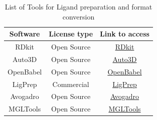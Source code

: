 \begin{table}[ht]
    \centering
    \caption{List of Tools for Ligand preparation and format conversion}
    \label{tab:list2}
    \begin{tabular}{|c|c|c|}
    \hline
         \textbf{Software} & \textbf{License type} & \textbf{Link to access} \\
    \hline
        RDkit & Open Source & \href{https://github.com/rdkit/rdkit}{RDkit} \\
        Auto3D & Open Source & \href{https://github.com/isayevlab/Auto3D_pkg}{Auto3D}  \\
        OpenBabel & Open Source & \href{https://github.com/openbabel/openbabel}{OpenBabel}  \\
        LigPrep & Commercial & \href{https://www.schrodinger.com/platform/products/ligprep/}{LigPrep} \\
        Avogadro & Open Source & \href{https://avogadro.cc/}{Avogadro}  \\
        MGLTools & Open Source & \href{https://ccsb.scripps.edu/mgltools/downloads/}{MGLTools} \\
    \hline
    \end{tabular}
\end{table}

